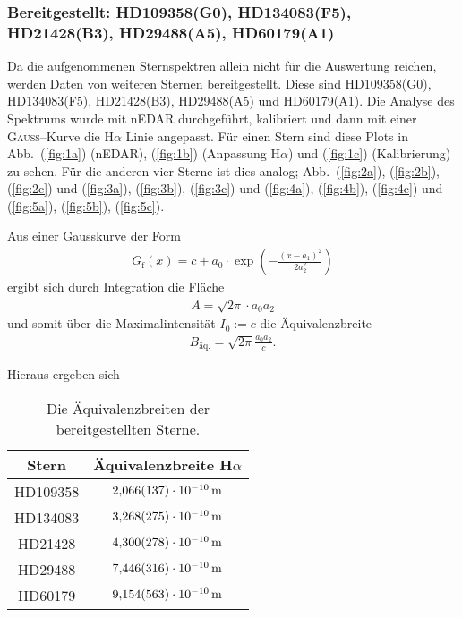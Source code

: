 \subsubsection{Bereitgestellt: HD109358(G0), HD134083(F5), HD21428(B3), HD29488(A5), HD60179(A1)}
Da die aufgenommenen Sternspektren allein nicht für die Auswertung reichen, werden Daten von weiteren Sternen bereitgestellt.
Diese sind HD109358(G0), HD134083(F5), HD21428(B3), HD29488(A5) und HD60179(A1).
Die Analyse des Spektrums wurde mit nEDAR durchgeführt, kalibriert und dann mit einer \textsc{Gauss}--Kurve die H$\alpha $ Linie angepasst.
Für einen Stern sind diese Plots in Abb.\ (\ref{fig:1a}) (nEDAR), (\ref{fig:1b}) (Anpassung H$\alpha $) und (\ref{fig:1c}) (Kalibrierung) zu sehen.
Für die anderen vier Sterne ist dies analog; Abb.\ (\ref{fig:2a}), (\ref{fig:2b}), (\ref{fig:2c}) und (\ref{fig:3a}), (\ref{fig:3b}), (\ref{fig:3c}) und (\ref{fig:4a}), (\ref{fig:4b}), (\ref{fig:4c}) und (\ref{fig:5a}), (\ref{fig:5b}), (\ref{fig:5c}).

Aus einer Gausskurve der Form
\begin{align}
  G_\textrm{f}(x)=c+a_0\cdot\exp(-\frac{(x-a_1)^2}{2a_2^2})
\end{align}
ergibt sich durch Integration die Fläche
\begin{align}
  A=\sqrt{2\pi}\cdot a_0a_2
\end{align}
und somit über die Maximalintensität $I_0:=c$ die Äquivalenzbreite
\begin{align}
  B_\textrm{äq.}=\sqrt{2\pi}\frac{a_0a_2}{c}.
\end{align}

Hieraus ergeben sich
\begin{table}[h]
  \begin{tabular}{cc}
    \toprule
    Stern & Äquivalenzbreite H$\alpha $\\
    \midrule
    HD109358 & $\SI{2.066+-0.137e-10}{m}$ \\
    HD134083 & $\SI{3.268+-0.275e-10}{m}$ \\
    HD21428 & $\SI{4.300+-0.278e-10}{m}$ \\
    HD29488 & $\SI{7.446+-0.316e-10}{m}$ \\
    HD60179 & $\SI{9.154+-0.563e-10}{m}$ \\
    \bottomrule
  \end{tabular}
  \caption{Die Äquivalenzbreiten der bereitgestellten Sterne.} \label{tab:äquivalenzbreiten}
\end{table} %

